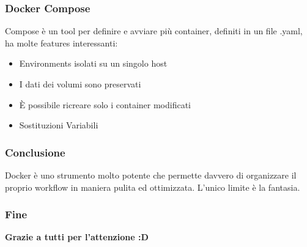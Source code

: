 \documentclass{beamer}
\begin{document}
\begin{frame}
    \frametitle{Docker Compose}
    Compose \`e un tool per definire e avviare pi\`u container, definiti in un file .yaml, ha molte features interessanti:
    \begin{itemize}
        \item<1-> Environments isolati su un singolo host
        \item<2-> I dati dei volumi sono preservati
        \item<3-> \`E possibile ricreare solo i container modificati
        \item<4-> Sostituzioni Variabili
    \end{itemize}
\end{frame}

\begin{frame}
    \frametitle{Conclusione}
    Docker \`e uno strumento molto potente che permette davvero di organizzare il proprio workflow in maniera pulita ed ottimizzata.
    L'unico limite \`e la fantasia.
\end{frame}


\begin{frame}
    \frametitle{Fine}
    \begin{center}
        \textbf{Grazie a tutti per l'attenzione :D}
    \end{center}
\end{frame}
\end{document}

